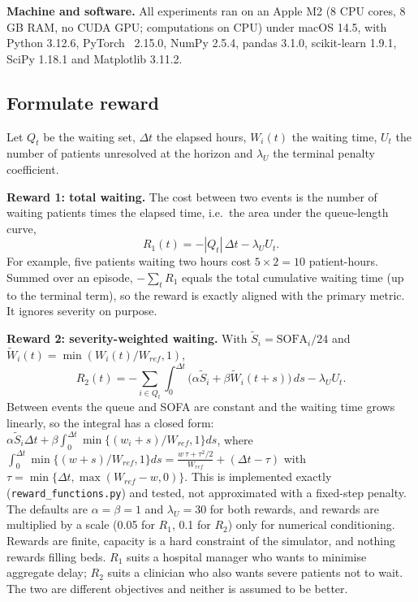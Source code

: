 \documentclass{rlreport}
\begin{document}
\textbf{Machine and software.} All experiments ran on an Apple M2 (8 CPU cores, 8 GB RAM, no CUDA GPU; computations on CPU) under macOS 14.5, with Python 3.12.6, PyTorch~\cite{paszke2019pytorch} 2.15.0, NumPy 2.5.4, pandas 3.1.0, scikit-learn 1.9.1, SciPy 1.18.1 and Matplotlib 3.11.2.

\subsection{Formulate reward}
Let $Q_t$ be the waiting set, $\Delta t$ the elapsed hours, $W_i(t)$ the waiting time, $U_t$ the number of patients unresolved at the horizon and $\lambda_U$ the terminal penalty coefficient.

\textbf{Reward 1: total waiting.} The cost between two events is the number of waiting patients times the elapsed time, i.e.\ the area under the queue-length curve,
\begin{equation}
  R_1(t)=-|Q_t|\,\Delta t-\lambda_UU_t.
  \label{eq:r1}
\end{equation}
For example, five patients waiting two hours cost $5\times2=10$ patient-hours. Summed over an episode, $-\sum_tR_1$ equals the total cumulative waiting time (up to the terminal term), so the reward is exactly aligned with the primary metric. It ignores severity on purpose.

\textbf{Reward 2: severity-weighted waiting.} With $\widetilde S_i=\mathrm{SOFA}_i/24$ and $\widetilde W_i(t)=\min(W_i(t)/W_{ref},1)$,
\begin{equation}
  R_2(t)=-\sum_{i\in Q_t}\int_{0}^{\Delta t}\!\big(\alpha\widetilde S_i+\beta\widetilde W_i(t+s)\big)\,ds-\lambda_UU_t.
  \label{eq:r2}
\end{equation}
Between events the queue and SOFA are constant and the waiting time grows linearly, so the integral has a closed form: $\alpha\widetilde S_i\Delta t+\beta\int_0^{\Delta t}\min\{(w_i+s)/W_{ref},1\}ds$, where $\int_0^{\Delta t}\min\{(w+s)/W_{ref},1\}ds=\frac{w\,\tau+\tau^2/2}{W_{ref}}+(\Delta t-\tau)$ with $\tau=\min\{\Delta t,\max(W_{ref}-w,0)\}$. This is implemented exactly (\texttt{reward\_functions.py}) and tested, not approximated with a fixed-step penalty. The defaults are $\alpha=\beta=1$ and $\lambda_U=30$ for both rewards, and rewards are multiplied by a scale (0.05 for $R_1$, 0.1 for $R_2$) only for numerical conditioning. Rewards are finite, capacity is a hard constraint of the simulator, and nothing rewards filling beds. $R_1$ suits a hospital manager who wants to minimise aggregate delay; $R_2$ suits a clinician who also wants severe patients not to wait. The two are different objectives and neither is assumed to be better.
\end{document}
